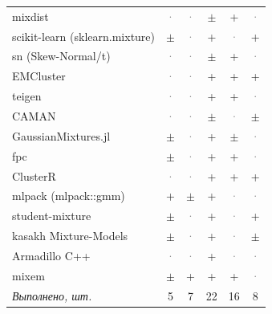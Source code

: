 \documentclass[10pt,a4paper]{article}
\begin{document}
\begin{landscape}
{\begin{longtable}{@{}l *{5}{c}@{}}
mixdist & \textcolor{gray}{·} & \textcolor{gray}{·} & \cellcolor{part!45}$\pm$ & \cellcolor{yes!35}+ & \textcolor{gray}{·} \\
scikit-learn (sklearn.mixture) & \cellcolor{part!45}$\pm$ & \textcolor{gray}{·} & \cellcolor{yes!35}+ & \textcolor{gray}{·} & \cellcolor{yes!35}+ \\
sn (Skew-Normal/t) & \textcolor{gray}{·} & \textcolor{gray}{·} & \cellcolor{part!45}$\pm$ & \cellcolor{yes!35}+ & \textcolor{gray}{·} \\
EMCluster & \textcolor{gray}{·} & \textcolor{gray}{·} & \cellcolor{yes!35}+ & \cellcolor{yes!35}+ & \cellcolor{yes!35}+ \\
teigen & \textcolor{gray}{·} & \textcolor{gray}{·} & \cellcolor{yes!35}+ & \cellcolor{yes!35}+ & \textcolor{gray}{·} \\
CAMAN & \textcolor{gray}{·} & \textcolor{gray}{·} & \cellcolor{part!45}$\pm$ & \textcolor{gray}{·} & \cellcolor{part!45}$\pm$ \\
GaussianMixtures.jl & \cellcolor{part!45}$\pm$ & \textcolor{gray}{·} & \cellcolor{yes!35}+ & \cellcolor{part!45}$\pm$ & \textcolor{gray}{·} \\
fpc & \cellcolor{part!45}$\pm$ & \textcolor{gray}{·} & \cellcolor{yes!35}+ & \cellcolor{yes!35}+ & \textcolor{gray}{·} \\
ClusterR & \textcolor{gray}{·} & \textcolor{gray}{·} & \cellcolor{yes!35}+ & \cellcolor{yes!35}+ & \cellcolor{yes!35}+ \\
mlpack (mlpack::gmm) & \cellcolor{yes!35}+ & \cellcolor{part!45}$\pm$ & \cellcolor{yes!35}+ & \textcolor{gray}{·} & \textcolor{gray}{·} \\
student-mixture & \cellcolor{part!45}$\pm$ & \textcolor{gray}{·} & \cellcolor{yes!35}+ & \textcolor{gray}{·} & \cellcolor{yes!35}+ \\
kasakh Mixture-Models & \cellcolor{part!45}$\pm$ & \textcolor{gray}{·} & \cellcolor{yes!35}+ & \textcolor{gray}{·} & \cellcolor{part!45}$\pm$ \\
Armadillo C++ & \textcolor{gray}{·} & \textcolor{gray}{·} & \cellcolor{yes!35}+ & \textcolor{gray}{·} & \textcolor{gray}{·} \\
mixem & \cellcolor{part!45}$\pm$ & \cellcolor{yes!35}+ & \cellcolor{yes!35}+ & \cellcolor{yes!35}+ & \textcolor{gray}{·} \\
\midrule \textit{Выполнено, шт.} & 5 & 7 & 22 & 16 & 8 \\
\bottomrule
\end{longtable}}
{\scriptsize\setlength{\tabcolsep}{3pt}
}
\end{landscape}
\end{document}
